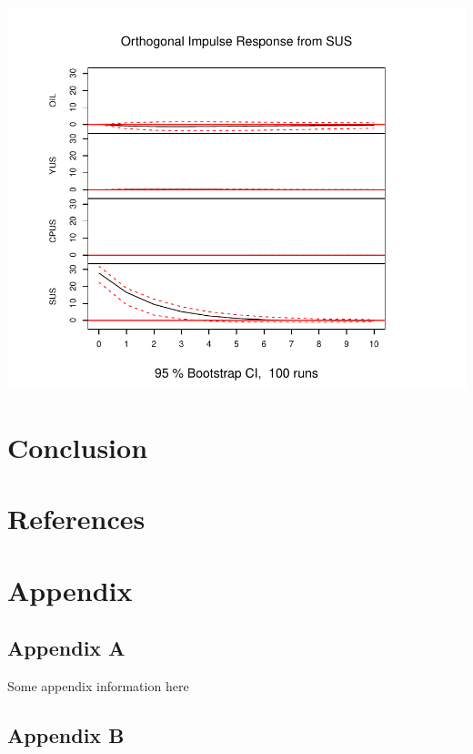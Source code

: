 \documentclass[11pt,preprint, authoryear]{elsarticle}
\numberwithin{equation}{section}
\numberwithin{figure}{section}
\numberwithin{table}{section}
\newlength{\cslhangindent}
\newenvironment{CSLReferences}%
  {\setlength{\parindent}{0pt}%
  \everypar{\setlength{\hangindent}{\cslhangindent}}\ignorespaces}%
  {\par}
\begin{document}
\includegraphics{replication_files/figure-latex/unnamed-chunk-6-4.pdf}

\hypertarget{conclusion}{%
\section{Conclusion}\label{conclusion}}

\newpage

\hypertarget{references}{%
\section*{References}\label{references}}

\hypertarget{refs}{}
\begin{CSLReferences}{0}{0}
\end{CSLReferences}

\hypertarget{appendix}{%
\section*{Appendix}\label{appendix}}

\hypertarget{appendix-a}{%
\subsection*{Appendix A}\label{appendix-a}}

Some appendix information here

\hypertarget{appendix-b}{%
\subsection*{Appendix B}\label{appendix-b}}


\end{document}
